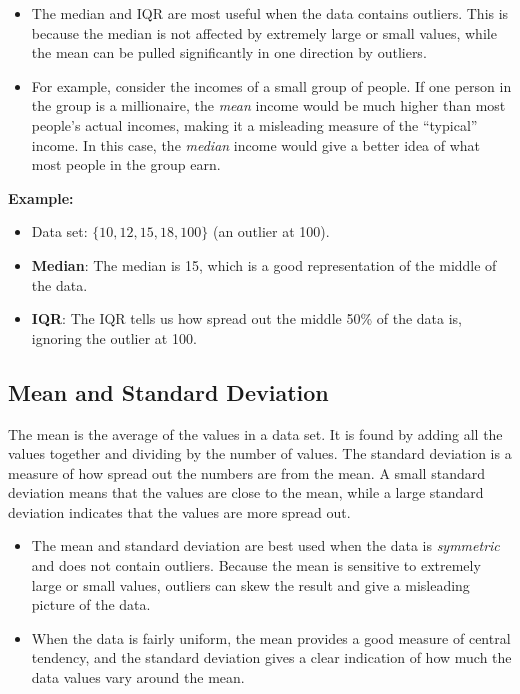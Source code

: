 \documentclass[12pt]{article}
\begin{document}
\begin{itemize}
  \item The median and IQR are most useful when the data contains outliers.
        This is because the median is not affected by extremely large or small
        values, while the mean can be pulled significantly in one direction by
        outliers.
  \item For example, consider the incomes of a small group of people. If one
        person in the group is a millionaire, the \emph{mean} income would be
        much higher than most people's actual incomes, making it a misleading
        measure of the ``typical'' income. In this case, the \emph{median}
        income would give a better idea of what most people in the group earn.
\end{itemize}

\textbf{Example:}

\begin{itemize}
  \item Data set: $\{10, 12, 15, 18, 100\}$ (an outlier at 100).
  \item \textbf{Median}: The median is 15, which is a good representation of the
        middle of the data.
  \item \textbf{IQR}: The IQR tells us how spread out the middle 50\% of the
        data is, ignoring the outlier at 100.
\end{itemize}

\subsection{Mean and Standard Deviation}

The mean is the average of the values in a data set. It is found by adding all
the values together and dividing by the number of values. The standard deviation
is a measure of how spread out the numbers are from the mean. A small standard
deviation means that the values are close to the mean, while a large standard
deviation indicates that the values are more spread out.

\begin{itemize}
  \item The mean and standard deviation are best used when the data is
        \emph{symmetric} and does not contain outliers. Because the mean is
        sensitive to extremely large or small values, outliers can skew the
        result and give a misleading picture of the data.
  \item When the data is fairly uniform, the mean provides a good measure of
        central tendency, and the standard deviation gives a clear indication of
        how much the data values vary around the mean.
\end{itemize}
\end{document}
